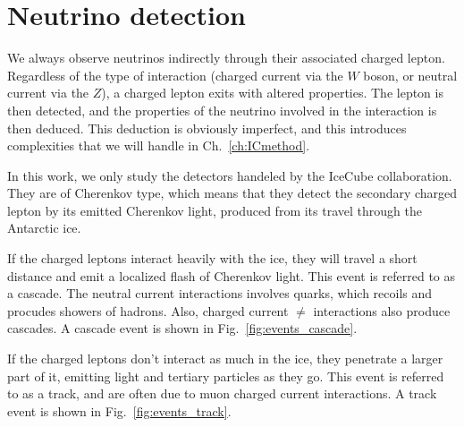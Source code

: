 % 
% 
\section{Neutrino detection}
We always observe neutrinos indirectly through their associated charged lepton. Regardless of the type of interaction (charged current via the $W$ boson, or neutral current
via the $Z$), a charged lepton exits with altered properties. The lepton is then detected, and the properties of the neutrino involved in the 
interaction is then deduced. This deduction is obviously imperfect, and this introduces complexities that we will handle in Ch.~\ref{ch:ICmethod}. 

In this work, we only study the detectors handeled by the IceCube collaboration. They are of Cherenkov type, which means that they detect 
the secondary charged lepton by its emitted Cherenkov light, produced from its travel through the Antarctic ice. 

If the charged leptons interact heavily with the ice, they will travel a short distance and emit a localized flash of 
Cherenkov light. This event is referred to as a cascade. The neutral current interactions involves quarks, which recoils and procudes
showers of hadrons. Also, charged current $\ne$ interactions also produce cascades. A cascade event 
is shown in Fig.~\ref{fig:events_cascade}.

If the charged leptons don't interact as much in the ice, they penetrate a larger part of it, emitting light and tertiary particles
as they go. This event is referred to as a track, and are often due to muon charged current interactions. A track event 
is shown in Fig.~\ref{fig:events_track}.

